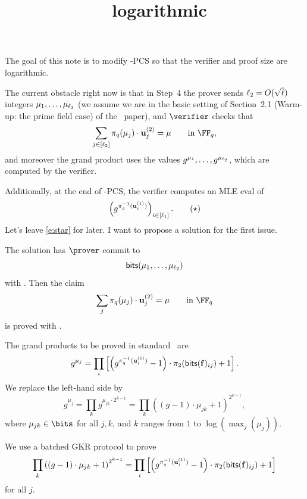 \documentclass[11pt,letterpaper,usenames,dvipsnames]{article}
\title{\ftwoz\ logarithmic}
\author{}
\date{}
\begin{document}
\maketitle

The goal of this note is to modify \ftwoz-PCS so that the verifier and proof size are logarithmic.

The current obstacle right now is that in Step~4 the prover sends $\ell_2 = O(\sqrt{\ell})$ integers $\mu_1, \ldots, \mu_{\ell_2}$ (we assume we are in the basic setting of Section~2.1 (Warm-up: the prime field case) of the \ftwoz\ paper), and $\verifier$ checks that
%
\[
\sum_{j\in [\codedim_2]} \pi_q(\mu_j)\cdot \uu_j^{(2)} = \mu \qquad \text{in } \FF_q,
\]
%
and moreover the grand product uses the values $g^{\mu_1}, \ldots, g^{\mu_{\ell_2}}$, which are computed by the verifier.

Additionally, at the end of \ftwoz-PCS, the verifier computes an MLE eval of
%
\begin{equation}\label{e:star}
\left(g^{\pi_q^{-1}(\mathbf{u}_i^{(1)})}\right)_{i\in [\ell_1]}. \tag{$\star$}
\end{equation}
%
Let's leave \eqref{e:star} for later. I want to propose a solution for the first issue.

The solution has $\prover$ commit to
%
\[
\mathsf{bits}(\mu_1, \ldots, \mu_{\ell_2})
\]
%
with \ftwoz. Then the claim
\[
\sum_{j} \pi_q(\mu_j)\cdot \uu_j^{(2)} = \mu \qquad \text{in } \FF_q
\]
%
is proved with \ftwoz.

The grand products to be proved in standard \ftwoz\ are
%
\[
g^{\mu_j} = \prod_{i} \left[\left(g^{\pi_q^{-1}(\mathbf{u}_i^{(1)})} - 1\right)\cdot \pi_2(\mathsf{bits}(\mathbf{f})_{ij}) + 1\right].
\]
%
We replace the left-hand side by
%
\[
g^{\mu_j} = \prod_{k} g^{\mu_{jk}\cdot 2^{k-1}} = \prod_{k} \left((g-1)\cdot \mu_{jk} + 1\right)^{2^{k-1}},
\]
%
where $\mu_{jk}\in \bits$ for all $j,k$, and $k$ ranges from $1$ to $\log(\max_j(\mu_j))$.

We use a batched GKR protocol to prove
%
\[
\prod_{k} \left((g-1)\cdot \mu_{jk} + 1\right)^{2^{k-1}} = \prod_{i} \left[\left(g^{\pi_q^{-1}(\mathbf{u}_i^{(1)})} - 1\right)\cdot \pi_2(\mathsf{bits}(\mathbf{f})_{ij}) + 1\right]
\]
%
for all $j$.
\end{document}
